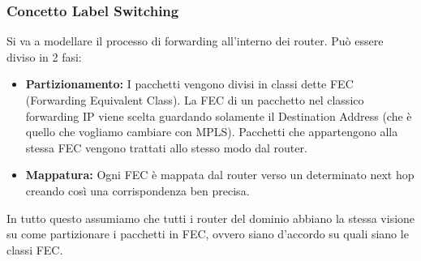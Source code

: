\documentclass{article}
\begin{document}
\subsubsection{Concetto Label Switching}
Si va a modellare il processo di forwarding all'interno dei router. Può essere diviso in 2 fasi:
\begin{itemize}
    \item \textbf{Partizionamento: } I pacchetti vengono divisi in classi dette FEC (Forwarding Equivalent Class). La FEC di un pacchetto nel classico forwarding IP viene scelta guardando solamente il Destination Address (che è quello che vogliamo cambiare con MPLS). Pacchetti che appartengono alla stessa FEC vengono trattati allo stesso modo dal router.
    \item \textbf{Mappatura: }  Ogni FEC è mappata dal router verso un determinato next hop creando così una corrispondenza ben precisa.
\end{itemize}
In tutto questo assumiamo che tutti i router del dominio abbiano la stessa visione su come partizionare i pacchetti in FEC, ovvero siano d'accordo su quali siano le classi FEC.\\
\end{document}
